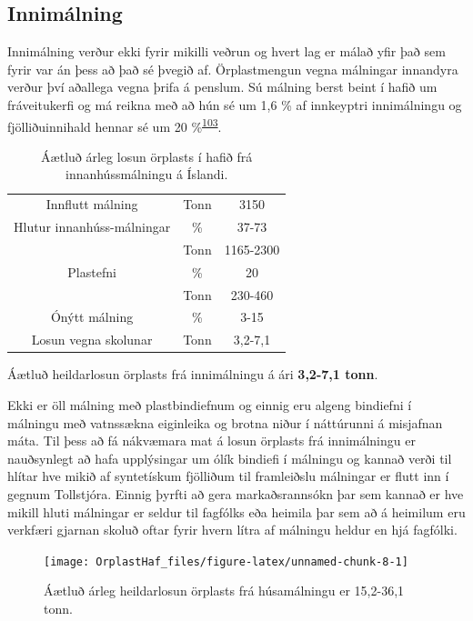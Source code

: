 \documentclass[icelandic,]{book}
\begin{document}
\hypertarget{innimalning}{%
\subsection*{Innimálning}\label{innimalning}}

Innimálning verður ekki fyrir mikilli veðrun og hvert lag er málað yfir það sem fyrir var án þess að það sé þvegið af. Örplastmengun vegna málningar innandyra verður því aðallega vegna þrifa á penslum. Sú málning berst beint í hafið um fráveitukerfi og má reikna með að hún sé um 1,6 \% af innkeyptri innimálningu og fjölliðuinnihald hennar sé um 20 \%\textsuperscript{\protect\hyperlink{ref-Hann2018}{103}}.

\begin{table}[t]

\caption{\label{tab:innimalningartafla}Áætluð árleg losun örplasts í hafið frá innanhússmálningu á Íslandi.}
\centering
\begin{tabular}{ccc}
\toprule
Innflutt málning & Tonn & 3150\\
Hlutur innanhúss-málningar & \% & 37-73\\
 & Tonn & 1165-2300\\
Plastefni & \% & 20\\
 & Tonn & 230-460\\
\addlinespace
Ónýtt málning & \% & 3-15\\
Losun vegna skolunar & Tonn & 3,2-7,1\\
\bottomrule
\end{tabular}
\end{table}

Áætluð heildarlosun örplasts frá innimálningu á ári \textbf{3,2-7,1 tonn}.

Ekki er öll málning með plastbindiefnum og einnig eru algeng bindiefni í málningu með vatnssækna eiginleika og brotna niður í náttúrunni á misjafnan máta. Til þess að fá nákvæmara mat á losun örplasts frá innimálningu er nauðsynlegt að hafa upplýsingar um ólík bindiefi í málningu og kannað verði til hlítar hve mikið af syntetískum fjölliðum til framleiðslu málningar er flutt inn í gegnum Tollstjóra. Einnig þyrfti að gera markaðsrannsókn þar sem kannað er hve mikill hluti málningar er seldur til fagfólks eða heimila þar sem að á heimilum eru verkfæri gjarnan skoluð oftar fyrir hvern lítra af málningu heldur en hjá fagfólki.

\begin{figure}

{\centering \texttt{[image: OrplastHaf\_files/figure-latex/unnamed-chunk-8-1]} 

}

\caption{Áætluð árleg heildarlosun örplasts frá húsamálningu er 15,2-36,1 tonn.}\label{fig:unnamed-chunk-8}
\end{figure}
\end{document}
